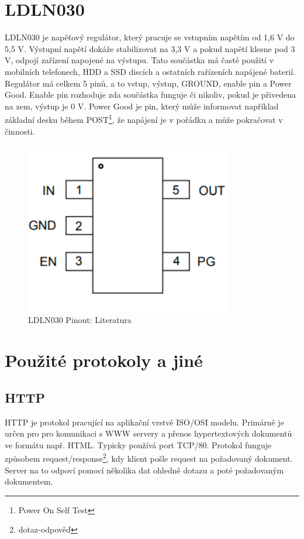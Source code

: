 \documentclass[a4paper, 12pt]{report}
\begin{document}
    \section{LDLN030}
    LDLN030 je napěťový regulátor, který pracuje se vstupním napětím od 1,6 V do 5,5 V. Výstupní napětí dokáže stabilizovat na 3,3 V a pokud napětí klesne pod 3 V, odpojí zařízení napojené na výstupu. Tato součástka má časté použití v mobilních telefonech, HDD a SSD discích a ostatních rařízeních napájené baterií. \\
    Regulátor má celkem 5 pinů, a to vstup, výstup, GROUND, enable pin a Power Good. Enable pin rozhoduje zda součástka funguje či nikoliv, pokud je přivedena na zem, výstup je 0 V. Power Good je pin, který může informovat například základní desku během POST\footnote{Power On Self Test}, že napájení je v pořádku a může pokračovat v činnosti.
    \begin{figure}[h]
        \centering
        \includegraphics[width=9cm]{images/ldln030_datasheet}
        \caption{LDLN030 Pinout: Literatura~\cite{stabilizator}}
        \label{fig:ldln030_datasheet}
    \end{figure}


    \section{Použité protokoly a jiné}

    \subsection{HTTP}
    HTTP je protokol pracující na aplikační vrstvě ISO/OSI modelu. Primárně je určen pro pro komunikaci s WWW servery a přenos hypertextových dokumentů ve formátu např. HTML. Typicky používá port TCP/80. Protokol funguje způsobem request/response\footnote{dotaz-odpověď}, kdy klient pošle request na požadovaný dokument. Server na to odpoví pomocí několika dat ohledně dotazu a poté požadovaným dokumentem.
\end{document}
